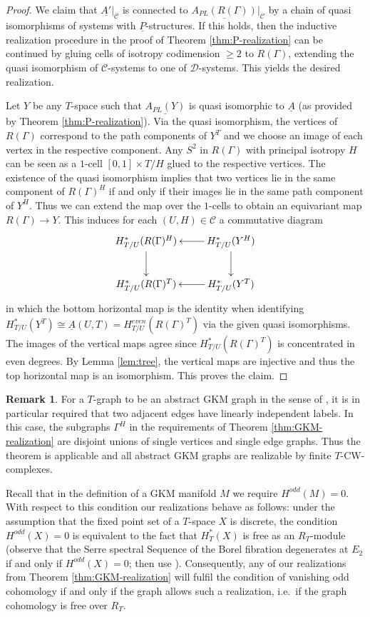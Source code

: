 \documentclass[12pt,a4paper]{article}
\theoremstyle{definition}
\newtheorem{rem}[thm]{Remark}
\begin{document}
\begin{proof}
We claim that $\underline{A'}|_\mathcal{C}$ is connected to $\underline{A_{PL}(R(\Gamma))}|_\mathcal{C}$ by a chain of quasi isomorphisms of systems with $\underline{P}$-structures. If this holds, then the inductive realization procedure in the proof of Theorem \ref{thm:P-realization} can be continued by gluing cells of isotropy codimension $\geq 2$ to $R(\Gamma)$, extending the quasi isomorphism of $\mathcal{C}$-systems to one of $\mathcal{D}$-systems. This yields the desired realization.

Let $Y$ be any $T$-space such that $\underline{A_{PL}(Y)}$ is quasi isomorphic to $\underline{A}$ (as provided by Theorem \ref{thm:P-realization}). Via the quasi isomorphism, the vertices of $R(\Gamma)$ correspond to the path components of $Y^T$ and we choose an image of each vertex in the respective component. Any $S^2$ in $R(\Gamma)$ with principal isotropy $H$ can be seen as a $1$-cell $[0,1]\times T/H$ glued to the respective vertices. The existence of the quasi isomorphism implies that two vertices lie in the same component of $R(\Gamma)^H$ if and only if their images lie in the same path component of $Y^H$. Thus we can extend the map over the $1$-cells to obtain an equivariant map $R(\Gamma)\rightarrow Y$. This induces for each $(U,H)\in \mathcal{C}$ a commutative diagram
\[\xymatrix{
H^*_{T/U}(R(\Gamma)^H)\ar[d] & H^*_{T/U}(Y^H)\ar[d]\ar[l]\\
H^*_{T/U}(R(\Gamma)^T) & H^*_{T/U}(Y^T)\ar[l]
}\]
in which the bottom horizontal map is the identity when identifying $H^*_{T/U}(Y^T)\cong \underline{A}(U,T)= H^{even}_{T/U}(R(\Gamma)^T)$ via the given quasi isomorphisms. The images of the vertical maps agree since $H^*_{T/U}(R(\Gamma)^T)$ is concentrated in even degrees. By Lemma \ref{lem:tree}, the vertical maps are injective and thus the top horizontal map is an isomorphism. This proves the claim.
\end{proof}

\begin{rem}\label{ex:Egraph} For a $T$-graph to be an abstract GKM graph in the sense of \cite{GuilleminZara}, it is in particular required that two adjacent edges have linearly independent labels. In this case, the subgraphs $\Gamma^H$ in the requirements of Theorem \ref{thm:GKM-realization} are disjoint unions of single vertices and single edge graphs. Thus the theorem is applicable and all abstract GKM graphs are realizable by finite $T$-CW-complexes. 

Recall that in the definition of a GKM manifold $M$ we require $H^{odd}(M)=0$. With respect to this condition our realizations behave as follows:
under the assumption that the fixed point set of a $T$-space $X$ is discrete, the condition $H^{odd}(X)=0$ is equivalent to the fact that $H^*_T(X)$ is free as an $R_T$-module (observe that the Serre spectral Sequence of the Borel fibration degenerates at $E_2$ if and only if $H^{odd}(X)=0$; then use \cite[Corollary 4.2.3]{AP}). Consequently, any of our realizations from Theorem \ref{thm:GKM-realization} will fulfil the condition of vanishing odd cohomology if and only if the graph allows such a realization, i.e.\ if the graph cohomology is free over $R_T$.

\end{rem}
\end{document}
